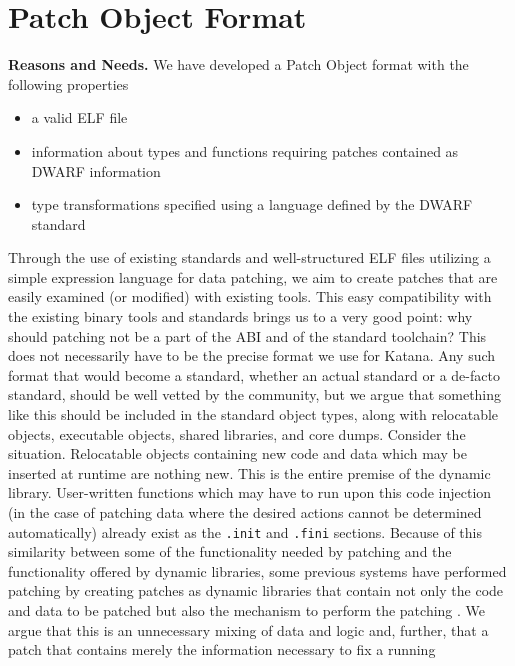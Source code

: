 \section{Patch Object Format}
\label{sec:poformat}
{\bf Reasons and Needs.}
We have developed a Patch Object format with the following properties
\begin{itemize}
 \item a valid ELF file
 \item information about types and functions requiring patches contained
   as DWARF information
 \item type transformations specified using a language defined by the
   DWARF standard
\end{itemize}
Through the use of existing standards and well-structured ELF files
utilizing a simple expression language for data patching, we aim to
create patches that are easily examined (or modified) with existing
tools. This easy compatibility with the existing binary tools and
standards brings us to a very good point: why should patching not be a
part of the ABI and of the standard toolchain? This does not
necessarily have to be the precise format we use for Katana. Any such
format that would become a standard, whether an actual standard or a
de-facto standard, should be well vetted by the community, but we argue
that something like this should be included in the standard object
types, along with relocatable objects, executable objects, shared
libraries, and core dumps. Consider the situation. Relocatable objects
containing new code and data which may be inserted at runtime are
nothing new. This is the entire premise of the dynamic
library. User-written functions which may have to run upon this code
injection (in the case of patching data where the desired actions
cannot be determined automatically) already exist as the
\texttt{.init} and \texttt{.fini} sections. Because of this similarity
between some of the functionality needed by patching and the
functionality offered by dynamic
libraries, some previous systems have performed patching by creating
patches as dynamic libraries that contain not only the code and data
to be patched but also the mechanism to perform the patching \cite{ginseng}
\cite{polus}. We argue that
this is an unnecessary mixing of data and logic and, further, that a patch
that contains merely the information necessary to fix a running
